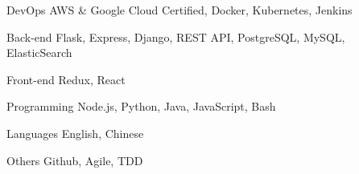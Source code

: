 

\begin{cvskills}

  \cvskill
    {DevOps} %
    {AWS \& Google Cloud Certified, Docker, Kubernetes, Jenkins} %

  \cvskill
    {Back-end} %
    {Flask, Express, Django, REST API, PostgreSQL, MySQL, ElasticSearch} %

  \cvskill
    {Front-end} %
    {Redux, React} %

  \cvskill
    {Programming} %
    {Node.js, Python, Java, JavaScript, Bash} %

  \cvskill
    {Languages} %
    {English, Chinese} %

  \cvskill
    {Others} %
    {Github, Agile, TDD} %


\end{cvskills}
